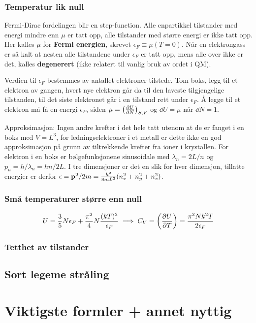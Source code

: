 \documentclass[12pt]{article}
\begin{document}
\subsubsection{Temperatur lik null}
Fermi-Dirac fordelingen blir en step-function. Alle enpartikkel tilstander med
energi mindre enn $\mu$ er tatt opp, alle tilstander med større energi er ikke
tatt opp. Her kalles $\mu$ for \textbf{Fermi energien}, skrevet $\epsilon_F \equiv \mu(T = 0)$.
Når en elektrongass er så kalt at nesten alle tilstandene under $\epsilon_F$ er tatt opp, mens alle
over ikke er det, kalles \textbf{degenerert} (ikke relatert til vanlig bruk av ordet i QM).

Verdien til $\epsilon_F$ bestemmes av antallet elektroner tilstede. Tom boks,
legg til et elektron av gangen, hvert nye elektron går da til den laveste
tilgjengelige tilstanden, til det siste elektronet går i en tilstand rett under
$\epsilon_F$. Å legge til et elektron må få en energi $\epsilon_F$, siden $\mu = \left( \pdv{U}{N} \right)_{S,V}$
og $\dd U = \mu$ når $\dd N = 1$.

Approksimasjon: Ingen andre krefter i det hele tatt utenom at de er fanget i en boks med $V = L^3$,
for ledningselektroner i et metall er dette ikke en god approksimasjon på grunn av
tiltrekkende krefter fra ioner i krystallen. For elektron i en boks er bølgefunksjonene
sinusoidale med $\lambda_n = 2L/n$ og $p_n = h/\lambda_n = hn/2L$. I tre dimensjoner
er det en slik for hver dimensjon, tillatte energier er derfor $\epsilon = \vb p^2 / 2m = \frac{h^2}{8mL^2} (n_x^2 + n_y^2 + n_z^2)$.

\subsubsection{Små temperaturer større enn null}
\begin{align*}
  U = \frac{3}{5} N \epsilon_F + \frac{\pi^2}{4} N \frac{(kT)^2}{\epsilon_F} \implies C_V = \left( \pdv{U}{T} \right) = \frac{\pi^2 N k^2 T}{2\epsilon_F}
\end{align*}
\subsubsection{Tetthet av tilstander}

\subsection{Sort legeme stråling}
\section{Viktigste formler + annet nyttig}
\end{document}
